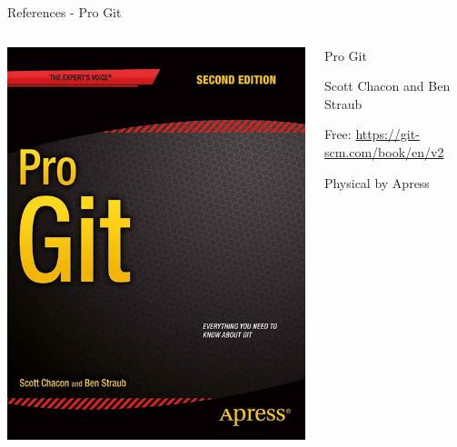 \documentclass[table,svgnames,aspectratio=169]{beamer}
\begin{document}
\begin{frame}[label={sec:orgc17609f}]{References - Pro Git}
\begin{columns}
\begin{column}{.5\columnwidth}
\begin{center}
\includegraphics[width=.75\textwidth]{graphics/progit2.png}
\end{center}
\end{column}

\begin{column}{.5\columnwidth}
Pro Git

Scott Chacon and Ben Straub 

Free: \url{https://git-scm.com/book/en/v2}

Physical by Apress
\end{column}
\end{columns}
\end{frame}
\end{document}
